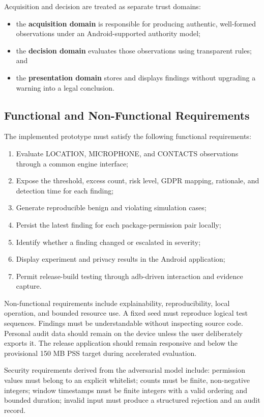 Acquisition and decision are treated as separate trust domains:
\begin{itemize}
\item the \textbf{acquisition domain} is responsible for producing authentic, well-formed observations under an Android-supported authority model;
\item the \textbf{decision domain} evaluates those observations using transparent rules; and
\item the \textbf{presentation domain} stores and displays findings without upgrading a warning into a legal conclusion.
\end{itemize}

\subsection{Functional and Non-Functional Requirements}

The implemented prototype must satisfy the following functional requirements:
\begin{enumerate}
\item Evaluate LOCATION, MICROPHONE, and CONTACTS observations through a common engine interface;
\item Expose the threshold, excess count, risk level, GDPR mapping, rationale, and detection time for each finding;
\item Generate reproducible benign and violating simulation cases;
\item Persist the latest finding for each package-permission pair locally;
\item Identify whether a finding changed or escalated in severity;
\item Display experiment and privacy results in the Android application;
\item Permit release-build testing through adb-driven interaction and evidence capture.
\end{enumerate}

Non-functional requirements include explainability, reproducibility, local operation, and bounded resource use. A fixed seed must reproduce logical test sequences. Findings must be understandable without inspecting source code. Personal audit data should remain on the device unless the user deliberately exports it. The release application should remain responsive and below the provisional 150 MB PSS target during accelerated evaluation.

Security requirements derived from the adversarial model include: permission values must belong to an explicit whitelist; counts must be finite, non-negative integers; window timestamps must be finite integers with a valid ordering and bounded duration; invalid input must produce a structured rejection and an audit record.


